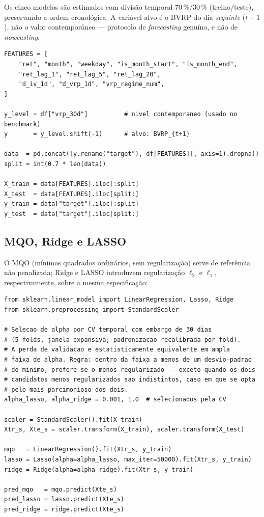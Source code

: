 Os cinco modelos são estimados com divisão temporal 70\,\%/30\,\% (treino/teste),
preservando a ordem cronológica. A variável-alvo é o BVRP do dia
\emph{seguinte} ($t+1$), não o valor contemporâneo --- protocolo de
\textit{forecasting} genuíno, e não de \textit{nowcasting}:

\begin{verbatim}
FEATURES = [
    "ret", "month", "weekday", "is_month_start", "is_month_end",
    "ret_lag_1", "ret_lag_5", "ret_lag_20",
    "d_iv_1d", "d_vrp_1d", "vrp_regime_num",
]

y_level = df["vrp_30d"]          # nivel contemporaneo (usado no benchmark)
y       = y_level.shift(-1)      # alvo: BVRP_{t+1}

data  = pd.concat([y.rename("target"), df[FEATURES]], axis=1).dropna()
split = int(0.7 * len(data))

X_train = data[FEATURES].iloc[:split]
X_test  = data[FEATURES].iloc[split:]
y_train = data["target"].iloc[:split]
y_test  = data["target"].iloc[split:]
\end{verbatim}

\subsection{MQO, Ridge e LASSO}

O MQO (mínimos quadrados ordinários, sem regularização) serve de referência
não penalizada; Ridge e LASSO introduzem regularização $\ell_2$ e $\ell_1$,
respectivamente, sobre a mesma especificação:

\begin{verbatim}
from sklearn.linear_model import LinearRegression, Lasso, Ridge
from sklearn.preprocessing import StandardScaler

# Selecao de alpha por CV temporal com embargo de 30 dias
# (5 folds, janela expansiva; padronizacao recalibrada por fold).
# A perda de validacao e estatisticamente equivalente em ampla
# faixa de alpha. Regra: dentro da faixa a menos de um desvio-padrao
# do minimo, prefere-se o menos regularizado -- exceto quando os dois
# candidatos menos regularizados sao indistintos, caso em que se opta
# pelo mais parcimonioso dos dois.
alpha_lasso, alpha_ridge = 0.001, 1.0  # selecionados pela CV

scaler = StandardScaler().fit(X_train)
Xtr_s, Xte_s = scaler.transform(X_train), scaler.transform(X_test)

mqo   = LinearRegression().fit(Xtr_s, y_train)
lasso = Lasso(alpha=alpha_lasso, max_iter=50000).fit(Xtr_s, y_train)
ridge = Ridge(alpha=alpha_ridge).fit(Xtr_s, y_train)

pred_mqo   = mqo.predict(Xte_s)
pred_lasso = lasso.predict(Xte_s)
pred_ridge = ridge.predict(Xte_s)
\end{verbatim}

